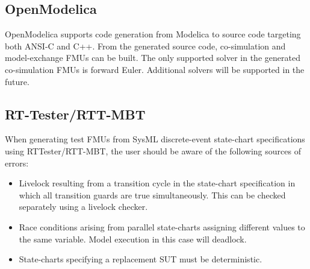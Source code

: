 %
%
%
\subsection{OpenModelica}
OpenModelica supports code generation from Modelica to source code targeting both ANSI-C and C++.
From the generated source code, co-simulation and model-exchange FMUs can be built.
The only supported solver in the generated co-simulation FMUs is forward Euler. 
Additional solvers will be supported in the future.
%
%
%
\subsection{RT-Tester/RTT-MBT}
When generating test FMUs from SysML discrete-event state-chart specifications using RTTester/RTT-MBT, the user should be aware of the following sources of errors:
%
%
%
\begin{itemize}
%
\item  Livelock resulting from a transition cycle in the state-chart specification in which all transition guards are true simultaneously.  This can be checked separately using a livelock checker.
%
\item  Race conditions arising from parallel state-charts assigning different values to the same variable.  Model execution in this case will deadlock.
%
\item  State-charts specifying a replacement SUT must be deterministic.
%
\end{itemize}
